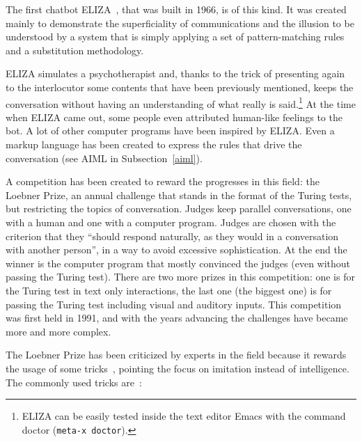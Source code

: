The first chatbot ELIZA~\cite{weizenbaum1966eliza}, that was built in 1966, is of this kind. It was created mainly to demonstrate the superficiality of communications and the illusion to be understood by a system that is simply applying a set of pattern-matching rules and a substitution methodology.

ELIZA simulates a psychotherapist and, thanks to the trick of presenting again to the interlocutor some contents that have been previously mentioned, keeps the conversation without having an understanding of what really is said.\footnote{ELIZA can be easily tested inside the text editor Emacs with the command doctor (\texttt{meta-x doctor}).} At the time when ELIZA came out, some people even attributed human-like feelings to the bot. A lot of other computer programs have been inspired by ELIZA. Even a markup language has been created to express the rules that drive the conversation (see AIML in Subsection~\ref{aiml}).

A competition has been created to reward the progresses in this field: the Loebner Prize, an annual challenge that stands in the format of the Turing tests, but restricting the topics of conversation. Judges keep parallel conversations, one with a human and one with a computer program. Judges are chosen with the criterion that they ``should respond naturally, as they would in a conversation with another person'', in a way to avoid excessive sophistication. At the end the winner is the computer program that mostly convinced the judges (even without passing the Turing test). There are two more prizes in this competition: one is for the Turing test in text only interactions, the last one (the biggest one) is for passing the Turing test including visual and auditory inputs. This competition was first held in 1991, and with the years advancing the challenges have became more and more complex.

The Loebner Prize has been criticized by experts in the field because it rewards the usage of some tricks~\cite{shieber1994lessons}, pointing the focus on imitation instead of intelligence.
The commonly used tricks are~\cite{mauldin1994chatterbots}:


